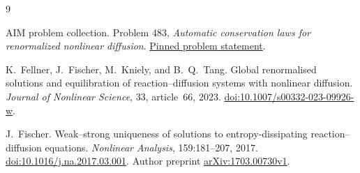 \documentclass[11pt]{article}
\begin{document}
\begin{thebibliography}{9}

AIM problem collection.
\newblock Problem 483, \emph{Automatic conservation laws for renormalized
nonlinear diffusion}.
\newblock \href{https://github.com/MColbrook/AIM/blob/b2ec0fac559f532fc0ed04fce81deea0ce07c68b/problems/483-nonlinear-diffusion-renormalization-mass-conservation.md}{Pinned problem statement}.

K.~Fellner, J.~Fischer, M.~Kniely, and B.~Q.~Tang.
\newblock Global renormalised solutions and equilibration of
reaction--diffusion systems with nonlinear diffusion.
\newblock \emph{Journal of Nonlinear Science}, 33, article~66, 2023.
\newblock \href{https://doi.org/10.1007/s00332-023-09926-w}{doi:10.1007/s00332-023-09926-w}.

J.~Fischer.
\newblock Weak--strong uniqueness of solutions to entropy-dissipating
reaction--diffusion equations.
\newblock \emph{Nonlinear Analysis}, 159:181--207, 2017.
\newblock \href{https://doi.org/10.1016/j.na.2017.03.001}{doi:10.1016/j.na.2017.03.001}.
\newblock Author preprint \href{https://arxiv.org/abs/1703.00730v1}{arXiv:1703.00730v1}.

\end{thebibliography}
\end{document}
